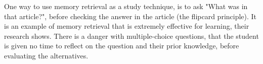   One way to use memory retrieval as a study technique, is to ask "What was in that article?", before checking the answer in the article (the flipcard principle). It is an example of memory retrieval that is extremely effective for learning, their research shows. There is a danger with multiple-choice questions, that the student is given no time to reflect on the question and their prior knowledge, before evaluating the alternatives.



%
